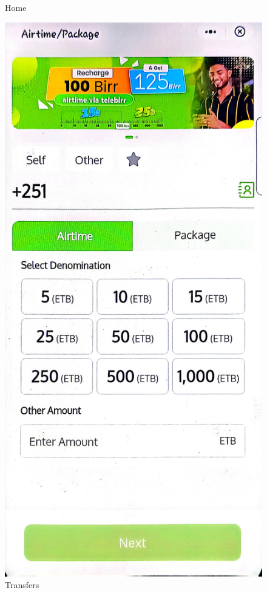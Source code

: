 \documentclass[a4paper,12pt]{report}
\begin{document}
\begin{figure}[h]
\begin{minipage}[b]{0.3\textwidth}
    \caption{Home}
  \end{minipage}
  \hfill
  \begin{minipage}[b]{0.3\textwidth}
    \includegraphics[width=\linewidth]{../images/screenshots/telebirr/telebirr_airtime-topup.jpg}
    \caption{Transfers}
  \end{minipage}
\end{figure}
\end{document}
